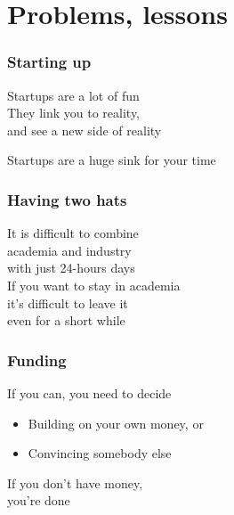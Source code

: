 \documentclass[17pt,aspectratio=169,hyperref=pdfusetitle]{beamer}
\begin{document}
\section{Problems, lessons}

\begin{frame}[fragile]
  \frametitle{Starting up}

  Startups are a lot of fun \\
  They link you to reality, \\
  and see a new side of reality \\
  
  \begin{center}
    Startups are a huge sink for your time
  \end{center}  
  
\end{frame}

\begin{frame}[fragile]
  \frametitle{Having two hats}

  It is difficult to combine \\
  academia and industry \\
  with just 24-hours days \\
  \vspace{1cm}
  If you want to stay in academia \\
  it's difficult to leave it \\
  even for a short while \\
\end{frame}

\begin{frame}[fragile]
  \frametitle{Funding}

  If you can, you need to decide \\
  \vspace{.5cm}
  \begin{itemize}
  \item Building on your own money, or
  \item Convincing somebody else
  \end{itemize}

  \begin{flushright}
  If you don't have money, \\
  you're done \\
  \end{flushright}
\end{frame}
\end{document}
